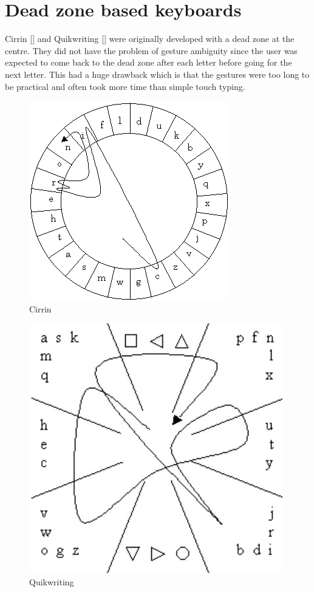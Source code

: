 \documentclass[MTech]{iitmdiss}
\begin{document}
\section{Dead zone based keyboards}
Cirrin [\cite{cirrin}] and Quikwriting [\cite{quicwriting}] were originally developed with a dead zone at the centre. They did not have the problem of gesture ambiguity since the user was expected to come back to the dead zone after each letter before going for the next letter. This had a huge drawback which is that the gestures were too long to be practical and often took more time than simple touch typing.
\begin{figure}[h!]
	\centering
	\includegraphics[scale=0.68]{Images/cirrin}
	\caption{Cirrin}
\end{figure}
\begin{figure}[h!]
	\centering
	\includegraphics[scale=0.7]{Images/quickwriting.jpg}
	\caption{Quikwriting}
\end{figure}
\end{document}
